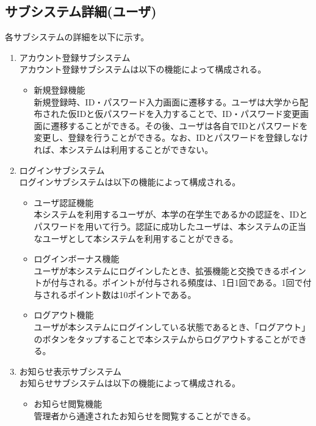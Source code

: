 \documentclass[a4j]{jarticle}
\begin{document}
\subsection{サブシステム詳細(ユーザ)}
各サブシステムの詳細を以下に示す。
\begin{enumerate}
  \item アカウント登録サブシステム\\
  アカウント登録サブシステムは以下の機能によって構成される。
  \begin{itemize}
    \item 新規登録機能\\
    新規登録時、ID・パスワード入力画面に遷移する。ユーザは大学から配布された仮IDと仮パスワードを入力することで、ID・パスワード変更画面に遷移することができる。その後、ユーザは各自でIDとパスワードを変更し、登録を行うことができる。なお、IDとパスワードを登録しなければ、本システムは利用することができない。
  \end{itemize}

  \item ログインサブシステム\\
  ログインサブシステムは以下の機能によって構成される。
  \begin{itemize}
    \item ユーザ認証機能\\
    本システムを利用するユーザが、本学の在学生であるかの認証を、IDとパスワードを用いて行う。認証に成功したユーザは、本システムの正当なユーザとして本システムを利用することができる。
    \item ログインボーナス機能\\
    ユーザが本システムにログインしたとき、拡張機能と交換できるポイントが付与される。ポイントが付与される頻度は、1日1回である。1回で付与されるポイント数は10ポイントである。
    \item ログアウト機能\\
    ユーザが本システムにログインしている状態であるとき、「ログアウト」のボタンをタップすることで本システムからログアウトすることができる。
  \end{itemize}

  \item お知らせ表示サブシステム\\
  お知らせサブシステムは以下の機能によって構成される。
  \begin{itemize}
    \item お知らせ閲覧機能\\
    管理者から通達されたお知らせを閲覧することができる。
  \end{itemize}


\end{enumerate}
\end{document}
